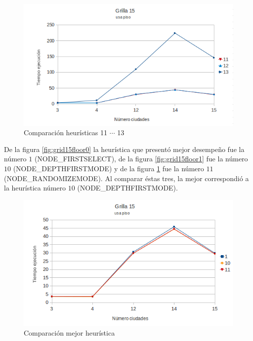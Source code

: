 \documentclass[10pt]{article}
\begin{document}
\begin{figure}[ht]
\begin{minipage}[b]{1\linewidth}
  \centering
 \includegraphics[scale=0.4]{grilla15floor2.png}
 \caption{Comparación heurísticas  11 $\cdots$ 13}
 \label{fig:grid15floor2}
\end{minipage}

\end{figure}


De la figura \ref{fig:grid15floor0} la heurística que presentó mejor desempeño fue la número $1$ (NODE\_FIRSTSELECT), de la figura \ref{fig:grid15floor1} fue la número $10$ (NODE\_DEPTHFIRSTMODE) y de la 
figura \ref{fig:grid15floor2} fue la número $11$ (NODE\_RANDOMIZEMODE). Al comparar éstas tres, la mejor correspondió a la heurística número $10$ (NODE\_DEPTHFIRSTMODE).


\begin{figure}[ht]
\begin{minipage}[b]{1\linewidth}

 \centering
 \includegraphics[scale=0.4]{grilla15floor3.png}
 \caption{Comparación mejor heurística}
 \label{fig:grid15floor3}
\end{minipage}
\end{figure}
\end{document}
